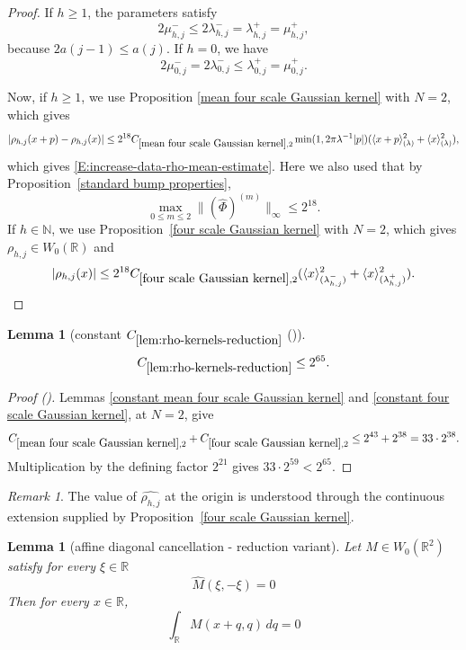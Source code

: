 \documentclass[12pt,reqno]{amsart}
\newcommand{\auto}{{({\tiny\faCar})}}
\theoremstyle{plain}
\newtheorem{lemma}[theorem]{Lemma}
\numberwithin{equation}{section}
\theoremstyle{remark}
\newtheorem{rem}{Remark}[section]
\newcommand{\using}[1]{}
\newcommand{\R}{{\mathbb R}}
\newcommand{\N}{{\mathbb N}}
\begin{document}
\begin{proof}
If \(h\geq1\), the parameters satisfy
\[
2\mu_{h,j}^-
\leq
2\lambda_{h,j}^-
=
\lambda_{h,j}^+
=
\mu_{h,j}^+,
\]
because \(2a(j-1)\leq a(j)\).
If $h=0$, we have
\[
2\mu_{0,j}^-
=
2\lambda_{0,j}^-
\leq
\lambda_{0,j}^+
=
\mu_{0,j}^+.
\]


Now, if $h\ge 1$, we  use Proposition
\ref{mean four scale Gaussian kernel}   with $N=2$, which  gives
\[|\rho_{h,j}(x+p)-\rho_{h,j}(x)| \le 2^{18} C_{\ref{mean four scale Gaussian kernel},2} \min(1,2\pi \lambda^{-1}|p|) (\langle x+p\rangle^2_{(\lambda)}+
\langle x\rangle^2_{(\lambda)}),
\]
which gives \eqref{E:increase-data-rho-mean-estimate}.
Here we also used that by Proposition~\ref{standard bump properties},
\[
\max_{0\leq m\leq2}
\|(\widehat\Phi)^{(m)}\|_\infty
\leq2^{18}.
\]
If $h\in \N$, we use  Proposition~\ref{four scale Gaussian kernel}   with $N=2$, which   gives $\rho_{h,j}\in W_0(\R)$ and
\[ |\rho_{h,j}(x)| \le 2^{18}C_{\ref{four scale Gaussian kernel},2} (\langle x\rangle^2_{(\lambda_{h,j}^-)} + \langle x\rangle^2_{(\lambda_{h,j}^+)}). \]
\end{proof}

\begin{lemma}[constant $C_{\ref{lem:rho-kernels-reduction}}$ \auto]\label{constant rho kernels reduction}\using{constant mean four scale Gaussian kernel}\using{constant four scale Gaussian kernel}\using{mean four scale Gaussian kernel}\using{four scale Gaussian kernel}
\begin{equation}\label{constant rho kernels reduction bound}
C_{\ref{lem:rho-kernels-reduction}}\le2^{65}.
\end{equation}
\end{lemma}
\begin{proof}[Proof \auto]
Lemmas \ref{constant mean four scale Gaussian kernel} and \ref{constant four scale Gaussian kernel}, at $N=2$, give
\[
C_{\ref{mean four scale Gaussian kernel},2}
+C_{\ref{four scale Gaussian kernel},2}
\le2^{43}+2^{38}=33\cdot2^{38}.
\]
Multiplication by the defining factor $2^{21}$ gives $33\cdot2^{59}<2^{65}$.
\end{proof}


\begin{rem}
The value of $\widehat{\rho_{h,j}}$   at the origin is understood through the continuous
extension supplied by Proposition~\ref{four scale Gaussian kernel}.
\end{rem}

\begin{lemma}[affine diagonal cancellation - reduction variant]
\label{lem:affine-diagonal-cancellation-reduction}\using{W_0 fiber integrals}
Let \(M\in W_0(\mathbb R^2)\) satisfy for every \(\xi\in\mathbb R\)
\begin{equation}\label{auto:affine-diagonal-cancellation-assumption}
\widehat M(\xi,-\xi)=0
\end{equation}
 Then for every \(x\in\mathbb R\),
\begin{equation}
    \label{E:affine-diagonal-cancellation}
    \int_{\mathbb R}M(x+q,q)\,dq=0
\end{equation}
\end{lemma}
\end{document}
